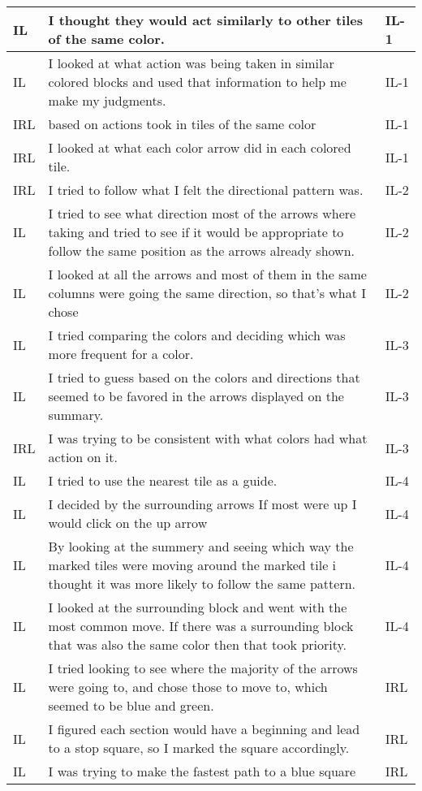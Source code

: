 \documentclass{article}
\begin{document}
\begin{longtable}{ | m{0.6in} | m{5in}| m{0.6in} | }
IL & I thought they would act similarly to other tiles of the same color. & IL-1 \\ \hline
IL & I looked at what action was being taken in similar colored blocks and used that information to help me make my judgments. & IL-1 \\ \hline
IRL & based on actions took in tiles of the same color & IL-1 \\ \hline
IRL & I looked at what each color arrow did in each colored tile. & IL-1 \\ \hline
IRL & I tried to follow what I felt the directional pattern was. & IL-2 \\ \hline
IL & I tried to see what direction most of the arrows where taking and tried to see if it would be appropriate to follow the same position as the arrows already shown.  & IL-2 \\ \hline
IL & I looked at all the arrows and most of them in the same columns were going the same direction, so that's what I chose & IL-2 \\ \hline
IL & I tried comparing the colors and deciding which was more frequent for a color.  & IL-3 \\ \hline
IL & I tried to guess based on the colors and directions that seemed to be favored in the arrows displayed on the summary. & IL-3 \\ \hline
IRL & I was trying to be consistent with what colors had what action on it. & IL-3 \\ \hline
IL & I tried to use the nearest tile as a guide. & IL-4 \\ \hline
IL & I decided by the surrounding arrows If most were up I would click on the up arrow & IL-4 \\ \hline
IL & By looking at the summery and seeing which way the marked tiles were moving around the marked tile i thought it was more likely to follow the same pattern. & IL-4 \\ \hline
IL & I looked at the surrounding block and went with the most common move. If there was a surrounding block that was also the same color then that took priority. & IL-4 \\ \hline
IL & I tried looking to see where the majority of the arrows were going to, and chose those to move to, which seemed to be blue and green. & IRL \\ \hline
IL & I figured each section would have a beginning and lead to a stop square, so I marked the square accordingly.  & IRL \\ \hline
IL & I was trying to make the fastest path to a blue square & IRL \\ \hline

\end{longtable}
\end{document}
